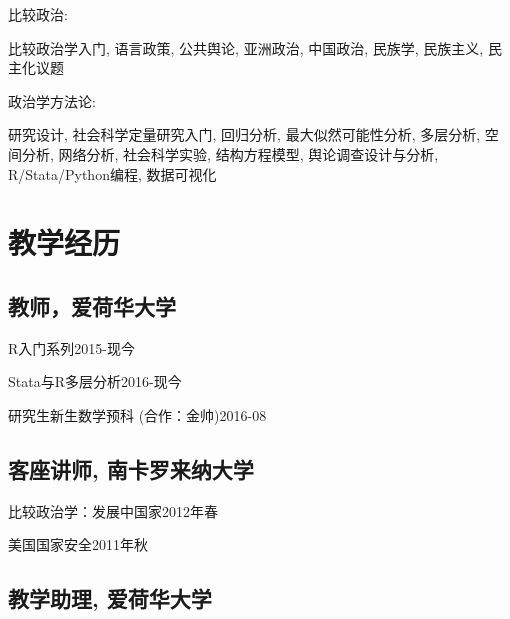 \documentclass[10.5pt,]{article}
\providecommand{\tightlist}{%
  \setlength{\itemsep}{0pt}\setlength{\parskip}{0pt}}
\renewenvironment{itemize}{
  \begin{list}{}{
    \setlength{\leftmargin}{1.5em}
  }
}{
  \end{list}
}
\begin{document}
\begin{itemize}
\tightlist
\item
  比较政治:

  \begin{itemize}
  \tightlist
  \item
    比较政治学入门, 语言政策, 公共舆论, 亚洲政治, 中国政治, 民族学,
    民族主义, 民主化议题
  \end{itemize}
\item
  政治学方法论:

  \begin{itemize}
  \tightlist
  \item
    研究设计, 社会科学定量研究入门, 回归分析, 最大似然可能性分析,
    多层分析, 空间分析, 网络分析, 社会科学实验, 结构方程模型,
    舆论调查设计与分析, R/Stata/Python编程, 数据可视化
  \end{itemize}
\end{itemize}

\section{教学经历}

\subsection{教师，爱荷华大学}

\begin{itemize}
\tightlist
\item
  R入门系列\hfill 2015-现今
\item
  Stata与R多层分析\hfill 2016-现今
\item
  研究生新生数学预科 (合作：金帅)\hfill 2016-08
\end{itemize}

\subsection{客座讲师, 南卡罗来纳大学}\label{-}

\begin{itemize}
\tightlist
\item
  比较政治学：发展中国家\hfill 2012年春
\item
  美国国家安全\hfill 2011年秋
\end{itemize}

\subsection{教学助理, 爱荷华大学}\label{-}
\end{document}
